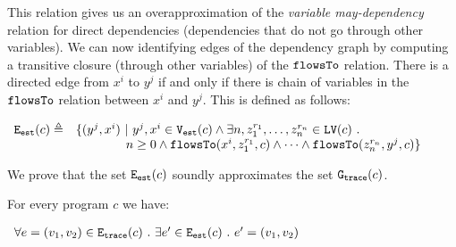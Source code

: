 This relation gives us an overapproximation of the \emph{variable may-dependency} relation for direct dependencies (dependencies that do not go through other variables).
%
%
We can now identifying edges of the dependency graph by computing a transitive closure (through other variables) of the  
 $\mathtt{flowsTo}$ relation. There is a directed edge from  $x^i$ to $y^j$ if and only if there is chain of variables 
    in the $\mathtt{flowsTo}$ relation between $x^i$ and $y^j$. This is defined as follows:
   \begin{center}
$
\begin{array}{cl}
    \mathtt{{E_{est}}}(c) \triangleq &
    \{ 
    (y^j, x^i)  ~ \vert ~ y^j, x^i \in \mathtt{{V_{est}}}(c)
    \land
      \exists n, z_1^{r_1}, \ldots, z_n^{r_n} \in \mathtt{LV}(c) ~.~ 
    \\ 
    & \qquad \qquad
      n \geq 0 \land
      \mathtt{flowsTo}(x^i,  z_1^{r_1}, c) 
      \land \cdots \land \mathtt{flowsTo}(z_n^{r_n}, y^j, c) 
    \}
    \end{array}
$
\end{center}    
We prove that the set $\mathtt{{E_{est}}}(c)$ soundly approximates the set $\mathtt{{G_{trace}}}(c)$.
	\begin{lem}
	\label{lem:edge_map}
	For every program $c$ we have:
   \begin{center}
$
	\begin{array}{l}
	\forall e = (v_1, v_2) \in \mathtt{{E_{trace}}}(c)
	~.~ 
	\exists e' \in \mathtt{{E_{est}}}(c) ~.~ e' = (v_1, v_2)
	\end{array}
$
\end{center} 
	\end{lem}

